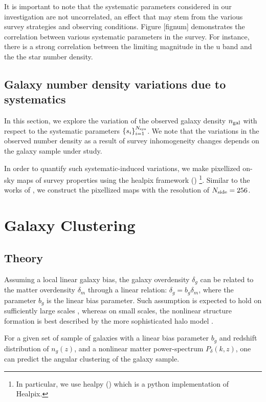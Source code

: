 \documentclass[fleqn,usenatbib,useAMS]{mnras}
\begin{document}
It is important to note that the systematic parameters considered in our investigation are not uncorrelated, an effect that may stem from the various survey strategies and observing conditions. 
Figure [fignum] demonstrates the correlation between various systematic parameters in the survey. 
For instance, there is a strong correlation between the limiting magnitude in the u band and the the star number density. 


\subsection{Galaxy number density variations due to systematics}

In this section, we explore the variation of the observed galaxy density $n_{\rm gal}$ with respect to the systematic parameters $\{s_i\}_{i=1}^{N_{\rm sys}}$. We note that the variations in the observed number density as a result of survey inhomogeneity changes depends on the galaxy sample under study. 

In order to quantify such systematic-induced variations, we make pixellized on-sky maps of survey properties using the healpix framework (\citealt{healpix}) \footnote{In particular, we use healpy (\citealt{healpy2019}) which is a python implementation of Healpix.}. Similar to the works of \citet{ross2017, rezaie2019}, we construct the pixellized maps with the resolution of $N_{\rm side} = 256$.


\section{Galaxy Clustering}\label{sec:clustering}
\subsection{Theory}

Assuming a local linear galaxy bias, the galaxy overdensity $\delta_g$ can be related to the matter overdensity $\delta_m$ through a linear relation: $\delta_g = b_g \delta_m$, where the parameter $b_g$ is the linear bias parameter. Such assumption is expected to hold on sufficiently large scales \citep[e.g.][]{dvornik2018}, whereas on small scales, the nonlinear structure formation is best described by the more sophisticated halo model \citep[e.g. ][]{hand2017,vakili_hahn}.

For a given set of sample of galaxies with a linear bias parameter $b_g$ and redshift distribution of $n_g(z)$, and a nonlinear matter power-spectrum $P_{\delta}(k,z)$, one can predict the angular clustering of the galaxy sample.
\end{document}
